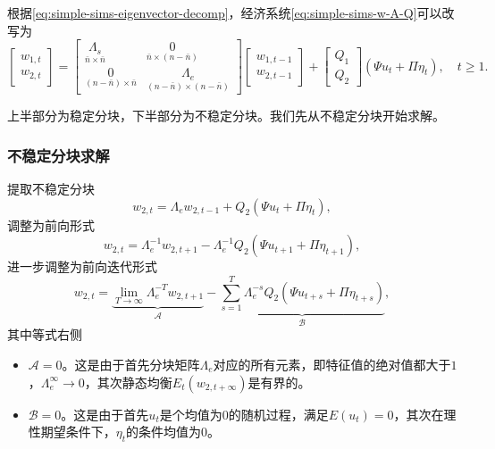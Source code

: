 根据\eqref{eq:simple-sims-eigenvector-decomp}，经济系统\eqref{eq:simple-sims-w-A-Q}可以改写为
\begin{equation}
  \label{eq:simple-sims-w}
  \begin{bmatrix}
    w_{1,t} \\
    w_{2,t}
  \end{bmatrix}
  =
  \begin{bmatrix}
    \underset{\bar{n} \times \bar{n}}{\Lambda_s} & \underset{\bar{n} \times \left( n - \bar{n} \right)}{0} \\
    \underset{\left( n - \bar{n} \right)  \times \bar{n}}{0} &  \underset{ \left( n - \bar{n} \right) \times \left( n - \bar{n}\right) }{\Lambda_e}
  \end{bmatrix}
  \begin{bmatrix}
    w_{1,t-1} \\
    w_{2,t-1}
  \end{bmatrix}
  +
  \begin{bmatrix}
     Q_1 \\
     Q_2
  \end{bmatrix}
  \left( \Psi u_t + \Pi \eta_t \right), \quad t \ge 1.
\end{equation}

上半部分为稳定分块，下半部分为不稳定分块。我们先从不稳定分块开始求解。

\subsubsection{不稳定分块求解}
提取不稳定分块
\begin{equation*}
  w_{2,t} = \Lambda_e w_{2,t-1} + Q_2 \left( \Psi u_t + \Pi \eta_t \right),
\end{equation*}
调整为前向形式
\begin{equation}
  \label{eq:simple-sims-w-foward-looking}
  w_{2,t} = \Lambda_e^{-1} w_{2,t+1} - \Lambda_e^{-1} Q_2 \left( \Psi u_{t+1} + \Pi \eta_{t+1} \right),
\end{equation}
进一步调整为前向迭代形式
\begin{equation}
  \label{eq:simple-sims-w-foward-looking-iteration}
  w_{2,t} = \underbrace{\lim_{T \rightarrow \infty} \Lambda_e^{-T} w_{2,t+1}}_{\mathcal{A}} - \underbrace{\sum_{s=1}^{T} \Lambda_e^{-s} Q_2 \left( \Psi u_{t+s} + \Pi \eta_{t+s} \right)}_{\mathcal{B}},
\end{equation}
其中等式右侧
\begin{itemize}
  \item $\mathcal{A} =0$。这是由于首先分块矩阵$\Lambda_{e}$对应的所有元素，即特征值的绝对值都大于$1$，$\Lambda_{e}^{\infty} \rightarrow 0$，其次静态均衡$E_{t} (w_{2,t+\infty})$是有界的。
  \item $\mathcal{B} = 0$。这是由于首先$u_t$是个均值为0的随机过程，满足$E(u_t)=0$，其次在理性期望条件下，$\eta_t$的条件均值为0。
\end{itemize}

